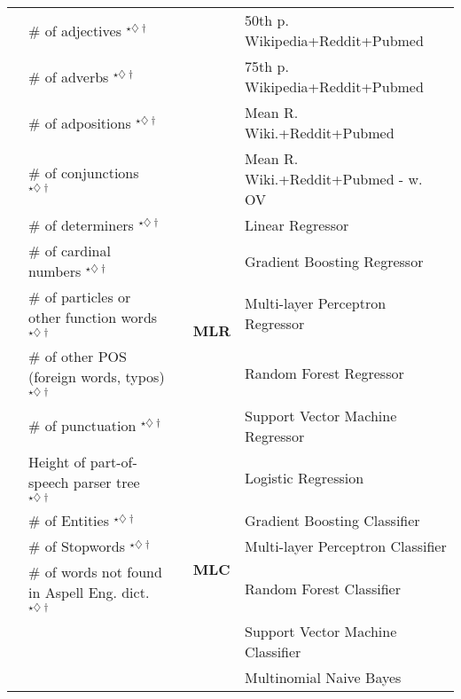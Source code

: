 \begin{table}[tb]
{\begin{tabular}{llcll}
 & \# of adjectives $^{\star\diamondsuit\dagger}$ &  &  & 50th p. Wikipedia+Reddit+Pubmed \tabularnewline
 & \# of adverbs $^{\star\diamondsuit\dagger}$ &  &  & 75th p. Wikipedia+Reddit+Pubmed \tabularnewline
 & \# of adpositions $^{\star\diamondsuit\dagger}$ &  &  & Mean R. Wiki.+Reddit+Pubmed \tabularnewline 
 & \# of conjunctions $^{\star\diamondsuit\dagger}$ & &  & Mean R. Wiki.+Reddit+Pubmed - w. OV \tabularnewline
\cline{4-5} 
 & \# of determiners $^{\star\diamondsuit\dagger}$ & & \multirow{5}{*}{\textbf{MLR}} & Linear Regressor\tabularnewline  
 & \# of cardinal numbers $^{\star\diamondsuit\dagger}$ &  &  & Gradient Boosting Regressor\tabularnewline
 & \# of particles or other function words $^{\star\diamondsuit\dagger}$ &  &  & Multi-layer Perceptron Regressor\tabularnewline
 & \# of other POS (foreign words, typos) $^{\star\diamondsuit\dagger}$ &  &  & Random Forest Regressor\tabularnewline
 & \# of punctuation $^{\star\diamondsuit\dagger}$ &  &  & Support Vector Machine Regressor\tabularnewline
\cline{4-5} 
 & Height of part-of-speech parser tree $^{\star\diamondsuit\dagger}$ &  &  \multirow{6}{*}{\textbf{MLC}} & Logistic Regression\tabularnewline
 & \# of Entities $^{\star\diamondsuit\dagger}$ &  &  & Gradient Boosting Classifier\tabularnewline
 & \# of Stopwords $^{\star\diamondsuit\dagger}$ &  &  & Multi-layer Perceptron Classifier\tabularnewline
 & \# of words not found in Aspell Eng. dict. $^{\star\diamondsuit\dagger}$ &  &  & Random Forest Classifier\tabularnewline
 &  &  &  & Support Vector Machine Classifier\tabularnewline
 &  &  &  & Multinomial Naive Bayes\tabularnewline
\cline{1-2} \cline{4-5} 
\end{tabular}
}
\vspace{-12pt}
\end{table}
